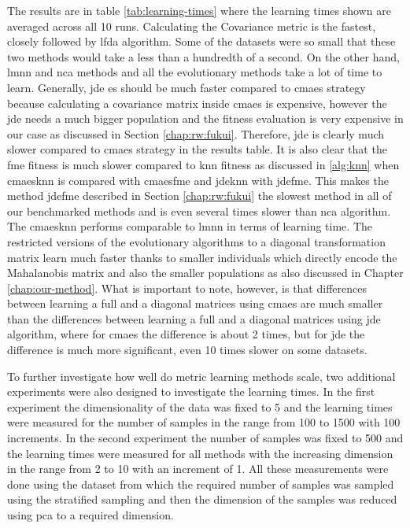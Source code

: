 \documentclass[12pt,a4paper]{report}
\begin{document}
The results are in table \ref{tab:learning-times} where the learning times shown are averaged across all 10 runs. Calculating the Covariance metric is the fastest, closely followed by \ac{lfda} algorithm. Some of the datasets were so small that these two methods would take a less than a hundredth of a second. On the other hand, \ac{lmnn} and \ac{nca} methods and all the evolutionary methods take a lot of time to learn. Generally, \ac{jde} \acl{es} should be much faster compared to \ac{cmaes} strategy because calculating a covariance matrix inside \ac{cmaes} is expensive, however the \ac{jde} needs a much bigger population and the fitness evaluation is very expensive in our case as discussed in Section \ref{chap:rw:fukui}. Therefore, \ac{jde} is clearly much slower compared to \ac{cmaes} strategy in the results table. It is also clear that the \ac{fme} fitness is much slower compared to \ac{knn} fitness as discussed in \ref{alg:knn} when \ac{cmaesknn} is compared with \ac{cmaesfme} and \ac{jdeknn} with \ac{jdefme}. This makes the method \ac{jdefme} described in Section \ref{chap:rw:fukui} the slowest method in all of our benchmarked methods and is even several times slower than \ac{nca} algorithm. The \ac{cmaesknn} performs comparable to \ac{lmnn} in terms of learning time. The restricted versions of the evolutionary algorithms to a diagonal transformation matrix learn much faster thanks to smaller individuals which directly encode the Mahalanobis matrix and also the smaller populations as also discussed in Chapter \ref{chap:our-method}. What is important to note, however, is that differences between learning a full and a diagonal matrices using \ac{cmaes} are much smaller than the differences between learning a full and a diagonal matrices using \ac{jde} algorithm, where for \ac{cmaes} the difference is about 2 times, but for \ac{jde} the difference is much more significant, even 10 times slower on some datasets.



To further investigate how well do metric learning methods scale, two additional experiments were also designed to investigate the learning times. In the first experiment the dimensionality of the data was fixed to 5 and the learning times were measured for the number of samples in the range from 100 to 1500 with 100 increments. In the second experiment the number of samples was fixed to 500 and the learning times were measured for all methods with the increasing dimension in the range from 2 to 10 with an increment of 1. All these measurements were done using the  dataset from which the required number of samples was sampled using the stratified sampling and then the dimension of the samples was reduced using \ac{pca} to a required dimension.
\end{document}
